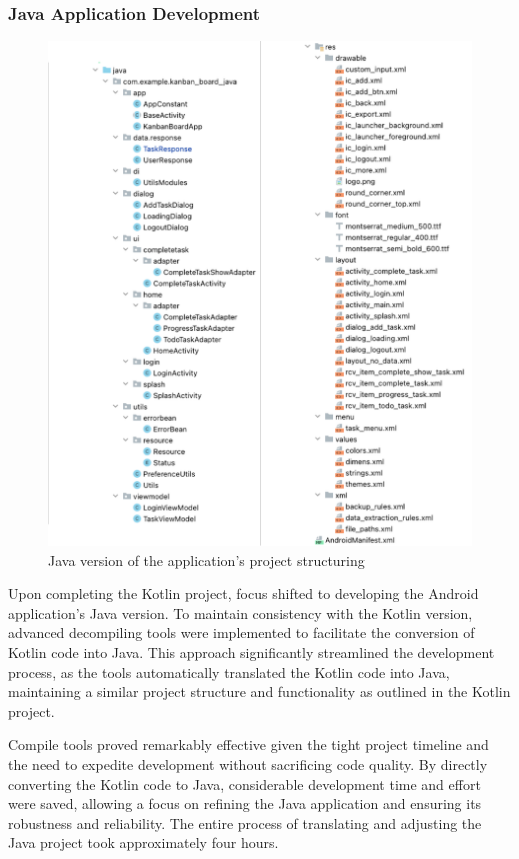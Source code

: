\subsubsection{Java Application Development}
\begin{figure}[htbp]
    \centering
    \includegraphics[scale = 0.8]{img/java_project_struct.png}
    \caption{Java version of the application’s project structuring}
    \label{fig:java_project_struct}
\end{figure}
\par
Upon completing the Kotlin project, focus shifted to developing the Android application's Java version. To maintain consistency with the Kotlin version, advanced decompiling tools were implemented to facilitate the conversion of Kotlin code into Java. This approach significantly streamlined the development process, as the tools automatically translated the Kotlin code into Java, maintaining a similar project structure and functionality as outlined in the Kotlin project.
\par
Compile tools proved remarkably effective given the tight project timeline and the need to expedite development without sacrificing code quality. By directly converting the Kotlin code to Java, considerable development time and effort were saved, allowing a focus on refining the Java application and ensuring its robustness and reliability. The entire process of translating and adjusting the Java project took approximately four hours.
